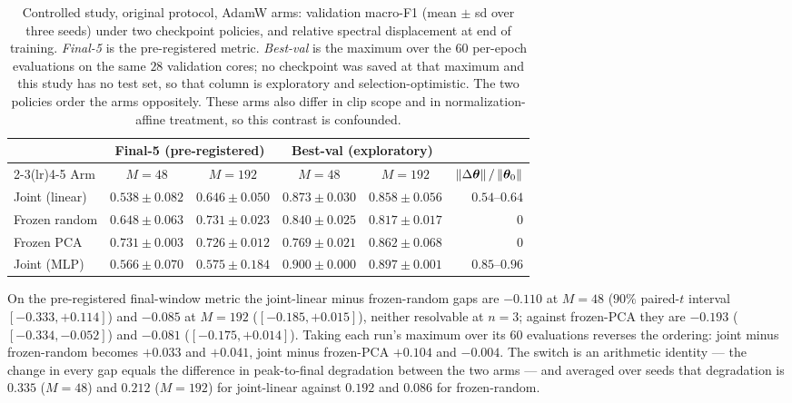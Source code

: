 \begin{table}[htbp]
\centering
\small
\caption{Controlled study, original protocol, AdamW arms: validation macro-F1
(mean $\pm$ sd over three seeds) under two checkpoint policies, and relative
spectral displacement at end of training. \emph{Final-5} is the pre-registered
metric. \emph{Best-val} is the maximum over the $60$ per-epoch evaluations on
the same $28$ validation cores; no checkpoint was saved at that maximum and
this study has no test set, so that column is exploratory and
selection-optimistic. The two policies order the arms oppositely. These arms
also differ in clip scope and in normalization-affine treatment, so this
contrast is confounded.}
\label{tab:app_e3c_orig}
\begin{tabular}{lccccr}
\toprule
& \multicolumn{2}{c}{Final-5 (pre-registered)} & \multicolumn{2}{c}{Best-val (exploratory)} & \\
\cmidrule(lr){2-3}\cmidrule(lr){4-5}
Arm & $M{=}48$ & $M{=}192$ & $M{=}48$ & $M{=}192$ & $\left\lVert\Delta{\boldsymbol{\theta}}\right\rVert/\left\lVert{\boldsymbol{\theta}}_0\right\rVert$ \\
\midrule
Joint (linear) & $0.538 \pm 0.082$ & $0.646 \pm 0.050$ & $0.873 \pm 0.030$ & $0.858 \pm 0.056$ & $0.54$--$0.64$ \\
Frozen random  & $0.648 \pm 0.063$ & $0.731 \pm 0.023$ & $0.840 \pm 0.025$ & $0.817 \pm 0.017$ & $0$ \\
Frozen PCA     & $0.731 \pm 0.003$ & $0.726 \pm 0.012$ & $0.769 \pm 0.021$ & $0.862 \pm 0.068$ & $0$ \\
Joint (MLP)    & $0.566 \pm 0.070$ & $0.575 \pm 0.184$ & $0.900 \pm 0.000$ & $0.897 \pm 0.001$ & $0.85$--$0.96$ \\
\bottomrule
\end{tabular}
\end{table}

On the pre-registered final-window metric the joint-linear minus
frozen-random gaps are $-0.110$ at $M = 48$ ($90\%$ paired-$t$ interval
$[-0.333, +0.114]$) and $-0.085$ at $M = 192$ ($[-0.185, +0.015]$), neither
resolvable at $n = 3$; against frozen-PCA they are $-0.193$
($[-0.334, -0.052]$) and $-0.081$ ($[-0.175, +0.014]$). Taking each run's
maximum over its $60$ evaluations reverses the ordering: joint minus
frozen-random becomes $+0.033$ and $+0.041$, joint minus frozen-PCA $+0.104$
and $-0.004$. The switch is an arithmetic identity --- the change in every gap
equals the difference in peak-to-final degradation between the two arms ---
and averaged over seeds that degradation is $0.335$ ($M = 48$) and $0.212$
($M = 192$) for joint-linear against $0.192$ and $0.086$ for frozen-random.

